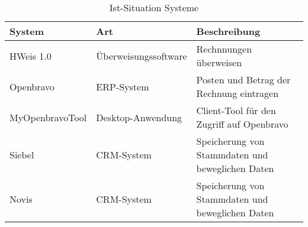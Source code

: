 \begin{table}[b]
\centering
\caption{Ist-Situation Systeme}
\label{tab:Ist-Situation-Systeme}
\begin{tabularx}{\linewidth}{@{}llX@{}}
\toprule
System          & Art                  & Beschreibung \\
\midrule
HWeis 1.0       & Überweisungssoftware & Rechnnungen überweisen \\
Openbravo       & ERP-System           & Posten und Betrag der Rechnung eintragen \\
MyOpenbravoTool & Desktop-Anwendung    & Client-Tool für den Zugriff auf Openbravo \\
Siebel          & CRM-System           & Speicherung von Stammdaten und beweglichen Daten \\
Novis           & CRM-System           & Speicherung von Stammdaten und beweglichen Daten \\
\bottomrule
\end{tabularx}
\end{table}
